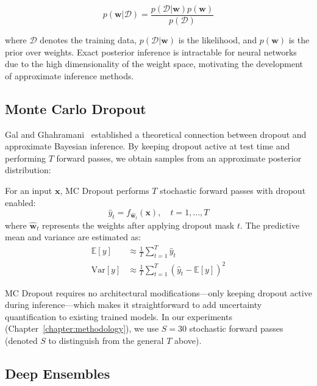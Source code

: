 \begin{equation}
    p(\mathbf{w}|\mathcal{D}) = \frac{p(\mathcal{D}|\mathbf{w})p(\mathbf{w})}{p(\mathcal{D})}
\end{equation}

where $\mathcal{D}$ denotes the training data, $p(\mathcal{D}|\mathbf{w})$ is the likelihood, and $p(\mathbf{w})$ is the prior over weights. Exact posterior inference is intractable for neural networks due to the high dimensionality of the weight space, motivating the development of approximate inference methods.

\subsection{Monte Carlo Dropout}

Gal and Ghahramani~\cite{gal2016dropout} established a theoretical connection between dropout and approximate Bayesian inference. By keeping dropout active at test time and performing $T$ forward passes, we obtain samples from an approximate posterior distribution:

\begin{definition}
For an input $\mathbf{x}$, MC Dropout performs $T$ stochastic forward passes with dropout enabled:
\begin{equation}
    \hat{y}_t = f_{\hat{\mathbf{w}}_t}(\mathbf{x}), \quad t = 1, \ldots, T
\end{equation}
where $\hat{\mathbf{w}}_t$ represents the weights after applying dropout mask $t$. The predictive mean and variance are estimated as:
\begin{align}
    \mathbb{E}[y] &\approx \frac{1}{T}\sum_{t=1}^{T}\hat{y}_t \\
    \text{Var}[y] &\approx \frac{1}{T}\sum_{t=1}^{T}(\hat{y}_t - \mathbb{E}[y])^2
\end{align}
\end{definition}

MC Dropout requires no architectural modifications---only keeping dropout active during inference---which makes it straightforward to add uncertainty quantification to existing trained models. In our experiments (Chapter~\ref{chapter:methodology}), we use $S = 30$ stochastic forward passes (denoted $S$ to distinguish from the general $T$ above).

\subsection{Deep Ensembles}

